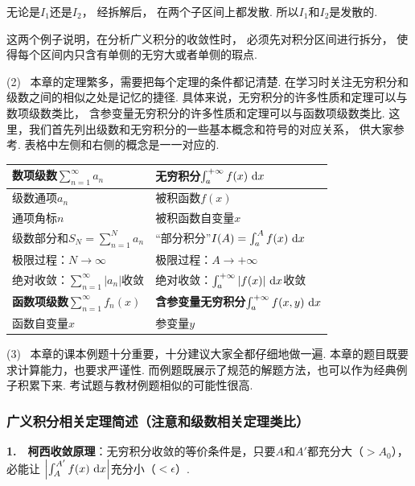无论是$I_1$还是$I_2$，
经拆解后，
在两个子区间上都发散.
所以$I_1$和$I_2$是发散的.

这两个例子说明，在分析广义积分的收敛性时，
必须先对积分区间进行拆分，
使得每个区间内只含有单侧的无穷大或者单侧的瑕点.\vspace{0.5em}

(2) ~本章的定理繁多，需要把每个定理的条件都记清楚.
在学习时关注无穷积分和级数之间的相似之处是记忆的捷径.
具体来说，无穷积分的许多性质和定理可以与数项级数类比，
含参变量无穷积分的许多性质和定理可以与函数项级数类比.
这里，我们首先列出级数和无穷积分的一些基本概念和符号的对应关系，
供大家参考.
表格中左侧和右侧的概念是一一对应的.\vspace{0.5em}

\begin{table}[!ht]
    \centering
    \renewcommand{\arraystretch}{2.25}
    \begin{tabular}{|C{6cm}|C{6cm}|}
    \hline
        \textbf{数项级数}$\sum_{n=1}^{\infty} a_n $ & \textbf{无穷积分}$\int_{a}^{+\infty} f(x) ~\mathrm{d} x $ \\ \hline
        级数通项$a_n$ & 被积函数$f(x)$ \\ \hline
        通项角标$n$ & 被积函数自变量$x$ \\ \hline
        级数部分和$S_N = \sum_{n=1}^{N} a_n$ & “部分积分”$I(A) = \int_{a}^{A} f(x)~\mathrm{d} x$ \\ \hline
        极限过程：$N \to \infty$ & 极限过程：$A \to +\infty$ \\ \hline
        绝对收敛：$\sum_{n=1}^{\infty} |a_n| $收敛 & 绝对收敛：$\int_{a}^{+\infty} |f(x)| ~\mathrm{d} x $收敛 \\ \hline
        \textbf{函数项级数}$\sum_{n=1}^{\infty} f_n(x) $ & \textbf{含参变量无穷积分}$\int_{a}^{+\infty} f(x,y) ~\mathrm{d} x $ \\ \hline
        函数自变量$x$ & 参变量$y$ \\ \hline
    \end{tabular}
\end{table}

(3) ~本章的课本例题十分重要，十分建议大家全都仔细地做一遍.
本章的题目既要求计算能力，也要求严谨性.
而例题既展示了规范的解题方法，也可以作为经典例子积累下来.
考试题与教材例题相似的可能性很高.

\subsubsection{广义积分相关定理简述（注意和级数相关定理类比）}

\textbf{1.}~~\textbf{柯西收敛原理}：无穷积分收敛的等价条件是，只要$A$和$A'$都充分大（$>A_0$），必能让
$\left| \int_{A}^{A'} f(x)~\mathrm{d} x \right|$充分小（$<\epsilon$）.\vspace{0.5em}

